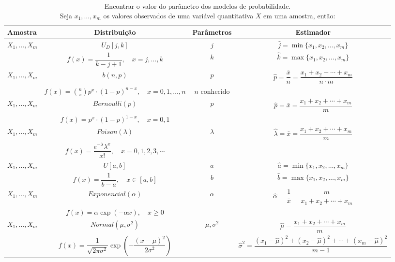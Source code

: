 \documentclass[8pt]{beamer}
\begin{document}
\begin{frame}{}

%   
%  
% 

 {\tiny
 \begin{table}[ht]
  \centering
  \caption{Encontrar o valor do parâmetro dos modelos de probabilidade. \\ 
   Seja $x_1, \dots, x_m$ os valores observados de uma variável quantitativa $X$ em uma amostra, então:}
  \begin{tabular}{l|c|c|c}
  \toprule[0.05cm]
   Amostra & Distribuição & Parâmetros & Estimador\\
   \midrule[0.05cm]
   $X_1, \dots, X_m$ & $U_D[j, k]$ & $j$ & $\hat{j}=\min\{x_1, x_2, \dots, x_m\}$\\
   & $f(x) = \dfrac{1}{k-j+1},\quad x = j, \dots, k$ & $k$ & $\hat{k} = \max\{x_1, x_2, \dots, x_m\}$ \\ \midrule
   $X_1, \dots, X_m$ & $b(n, p)$ & $p$ & $\hat{p} = \dfrac{\bar{x}}{n} =  \dfrac{x_1+x_2 + \cdots + x_m}{n\cdot m}$\\
   & $f(x) = {n \choose x} p^x \cdot (1-p)^{n-x}, \quad x = 0, 1, \dots, n$ & $n$ conhecido &\\ \midrule
   $X_1, \dots, X_m$ & $Bernoulli (p)$ & $p$ & $\hat{p} = \bar{x} = \dfrac{x_1+x_2 + \cdots + x_m}{m}$\\
   & $f(x) = p^x \cdot (1-p)^{1-x},\quad x= 0, 1$ & &\\ \midrule
   $X_1, \dots, X_m$ & $Poison(\lambda)$ & $\lambda$ & $\hat{\lambda} = \bar{x} = \dfrac{x_1+x_2+\cdots+x_m}{m}$\\
   & $f(x) = \dfrac{e^{-\lambda}\lambda^x}{x!},\quad x=0,1,2,3,\cdots$ & & \\ \midrule
   $X_1, \dots, X_m$ & $U[a, b]$ & $a$ & $\hat{a}=\min\{x_1, x_2, \dots, x_m\}$\\
   & $f(x) = \dfrac{1}{b-a}, \quad x \in [a, b]$ & $b$ & $\hat{b}=\max\{x_1, x_2, \dots, x_m\}$ \\ \midrule
   $X_1, \dots, X_m$ & $Exponencial(\alpha)$ & $\alpha$ & $\hat{\alpha} = \dfrac{1}{\bar{x}}=  \dfrac{m}{x_1+x_2+\cdots+x_m} $\\
   & $f(x) = \alpha \exp(-\alpha x),\quad x \geq 0$ && \\ \midrule
   $X_1, \dots, X_m$ & $Normal(\mu, \sigma^2)$ & $\mu, \sigma^2$ & $\hat{\mu} =  \dfrac{x_1+x_2 + \cdots + x_m}{m}$\\
   & $f(x) = \dfrac{1}{\sqrt{2\pi \sigma^2}} \exp\left( -\dfrac{(x-\mu)^2}{2\sigma^2} \right)$ && $\hat{\sigma}^2 = \dfrac{(x_1-\hat{\mu})^2+(x_2-\hat{\mu})^2+ \cdots +
   (x_m-\hat{\mu})^2}{m-1} $ \\ 
   \bottomrule[0.05cm]
  \end{tabular}
 \end{table}
 }
 
\end{frame}
\end{document}
